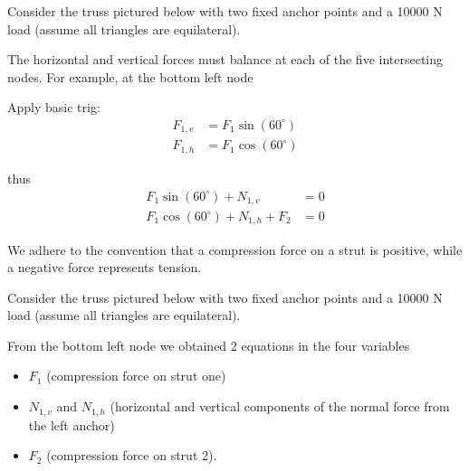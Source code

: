 \begin{applicationActivities}{2}{4}
\begin{observation}
Consider the truss pictured below with two fixed anchor points and a 10000 N load (assume all triangles are equilateral).
\drawtruss

The horizontal and vertical forces must balance at each of the five intersecting nodes.  For example, at the bottom left node
\begin{multicols}{4}


Apply basic trig:
\begin{align*}
F_{1,v}&=F_1 \sin(60^\circ) \\ F_{1,h}&=F_1\cos(60^\circ)
\end{align*} 

thus
\begin{align*}
F_1 \sin(60^\circ)+N_{1,v} &= 0 \\
F_1 \cos(60^\circ)+N_{1,h}+F_2 &= 0 
\end{align*}
\end{multicols}

We adhere to the convention that a compression force on a strut is positive, while a negative force represents tension.
\end{observation}

\begin{activity}{10}
Consider the truss pictured below with two fixed anchor points and a 10000 N load (assume all triangles are equilateral).
\drawtruss

From the bottom left node we obtained 2 equations in the four variables 
\begin{itemize}
\item $F_{1}$ (compression force on strut one)
\item $N_{1,v}$ and $N_{1,h}$ (horizontal and vertical components of the normal force from the left anchor)
\item $F_2$ (compression force on strut 2).
\end{itemize}


\end{activity}
\end{applicationActivities}
